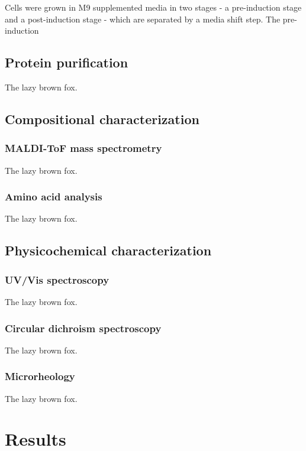 \begin{refsection}
Cells were grown in M9 supplemented
media in two stages - a pre-induction stage and a post-induction stage - which
are separated by a media shift step. The pre-induction

\subsection{Protein purification}

The lazy brown fox.

\subsection{Compositional characterization}

\subsubsection{MALDI-ToF mass spectrometry}

The lazy brown fox.

\subsubsection{Amino acid analysis}

The lazy brown fox.

\subsection{Physicochemical characterization}

\subsubsection{UV/Vis spectroscopy}

The lazy brown fox.

\subsubsection{Circular dichroism spectroscopy}

The lazy brown fox.

\subsubsection{Microrheology}

The lazy brown fox.

\section{Results}


\end{refsection}
